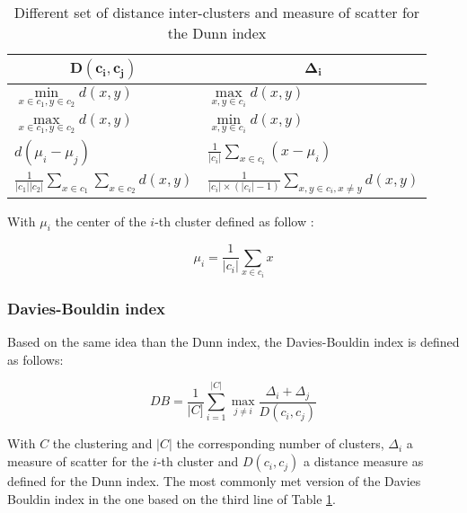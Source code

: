 \documentclass[a4paper]{report}
\begin{document}
    {\setlength{\extrarowheight}{10pt}%
    \begin{table}[h]
    \centering
    \begin{tabular}{|l|l|}
    \hline
    \multicolumn{1}{|c|}{$\mathbf{D(c_i, c_j)}$}                   & \multicolumn{1}{c|}{$\mathbf{\Delta_i}$}                                   \\ [10pt] \hline
    $\min\limits_{x \in c_1, y \in c_2} d(x, y)$                           & $\max\limits_{x, y \in c_i} d(x,y)$                                                       \\ [10pt] \hline
    $\max\limits_{x \in c_1, y \in c_2} d(x, y)$                           & $\min\limits_{x, y \in c_i} d(x,y)$                                                       \\ [10pt] \hline
    $d(\mu_i - \mu_j)$                                             & $\frac{1}{|c_i|}\sum_{x \in c_i}(x - \mu_i)$                               \\ [10pt] \hline
    $\frac{1}{|c_1||c_2|}\sum\limits_{x \in c_1}\sum\limits_{x \in c_2} d(x, y)$ & $\frac{1}{|c_i| \times (|c_i| - 1)} \sum\limits_{x, y \in c_i, x \neq y} d(x, y)$ \\ [10pt] \hline
    \end{tabular}
    \caption{Different set of distance inter-clusters and measure of scatter for the Dunn index}
    \label{tab:all_dunn_index}
    \end{table}}

    With $\mu_i$ the center of the $i$-th cluster defined as follow :

    \begin{equation}
        \mu_i = \frac{1}{|c_i|}\sum_{x \in c_i}x
        \label{eq:mui}
    \end{equation}

    \subsubsection{Davies-Bouldin index}
    Based on the same idea than the Dunn index, the Davies-Bouldin index is defined as follows:

    \begin{equation}
DB = \frac{1}{|C]}\sum_{i=1}^{|C|} \max_{j \neq i} \frac{\Delta_i + \Delta_j}{D(c_i,c_j)}
        \label{eq:db_index}
    \end{equation}

    With $C$ the clustering and $|C|$ the corresponding number of clusters, $\Delta_i$ a measure of scatter for the $i$-th cluster and $D(c_i, c_j)$ a distance measure as defined for the Dunn index. The most commonly met version of the Davies Bouldin index in the one based on the third line of Table \ref{tab:all_dunn_index}.
\end{document}

